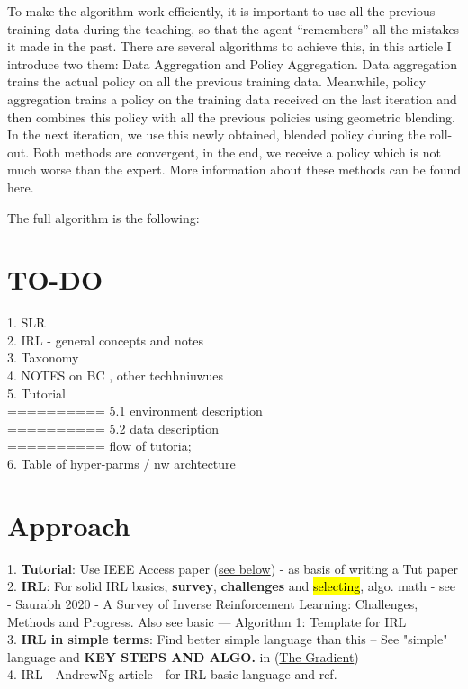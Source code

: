 \documentclass{article}
\newcommand{\hlc}[2][blue!10]{{\colorlet{foo}{#1} \sethlcolor{foo}\hl{#2}}}
\begin{document}
To make the algorithm work efficiently, it is important to use all the previous training data during the teaching, so that the agent “remembers” all the mistakes it made in the past. There are several algorithms to achieve this, in this article I introduce two them: Data Aggregation and Policy Aggregation. Data aggregation trains the actual policy on all the previous training data. Meanwhile, policy aggregation trains a policy on the training data received on the last iteration and then combines this policy with all the previous policies using geometric blending. In the next iteration, we use this newly obtained, blended policy during the roll-out. Both methods are convergent, in the end, we receive a policy which is not much worse than the expert. More information about these methods can be found here.

The full algorithm is the following:





\section{TO-DO}

1. SLR \\
2. IRL - general concepts and notes \\
3. Taxonomy \\
4. NOTES on BC , other techhniuwues\\
5. Tutorial \\
========== 5.1 environment description\\
========== 5.2 data  description\\
========== flow of tutoria; \\

6. Table of hyper-parms / nw archtecture\\



\clearpage

\section{Approach}

1. \textbf{Tutorial}: Use IEEE Access paper (\href{https://ieeexplore.ieee.org/document/9086464}{see below}) - as basis of writing a Tut paper\\
2. \textbf{IRL}: For solid IRL basics, \textbf{survey}, \textbf{challenges} and \hlc{selecting},  algo. math - see - Saurabh 2020 - A Survey of Inverse Reinforcement Learning: Challenges, Methods and Progress. Also see basic --- Algorithm 1: Template for IRL \\
3. \textbf{IRL in simple terms}: Find better simple language than this --  See "simple" language and \textbf{KEY STEPS AND ALGO.} in (\href{https://thegradient.pub/learning-from-humans-what-is-inverse-reinforcement-learning/}{The Gradient}) \\
4. IRL - AndrewNg article - for IRL basic language and ref. 
\end{document}

